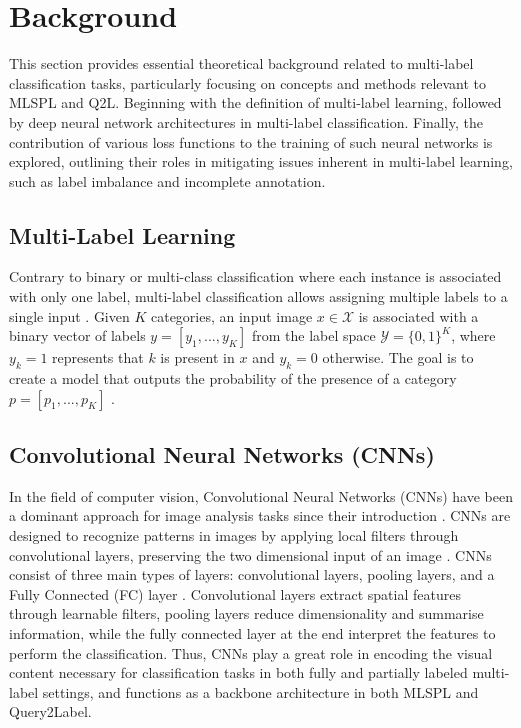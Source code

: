 \documentclass[lettersize,journal]{IEEEtran}
\begin{document}
\section{Background}
This section provides essential theoretical background related to multi-label classification tasks, particularly focusing on concepts and methods relevant to MLSPL and Q2L.  Beginning with the definition of multi-label learning, followed by deep neural network architectures in multi-label classification. Finally, the contribution of various loss functions to the training of such neural networks is explored, outlining their roles in mitigating issues inherent in multi-label learning, such as label imbalance and incomplete annotation.

\subsection{Multi-Label Learning}
Contrary to binary or multi-class classification where each instance is associated with only one label, multi-label classification allows assigning multiple labels to a single input \cite{mlsp}. Given $K$ categories, an input image $x\in \mathcal{X}$ is associated with a binary vector of labels $y=[y_1,...,y_K]$ from the label space $\mathcal{Y}=\{0,1\}^K$, where $y_k=1$ represents that $k$ is present in $x$ and $y_k=0$ otherwise. The goal is to create a model that outputs the probability of the presence of a category $p=[p_1,...,p_K]$ \cite{mlsp,Query2Label}.

\subsection{Convolutional Neural Networks (CNNs)}
In the field of computer vision, Convolutional Neural Networks (CNNs) have been a dominant approach for image analysis tasks since their introduction \cite{lecun95}. CNNs are designed to recognize patterns in images by applying local filters through convolutional layers, preserving the two dimensional input of an image \cite{zhang2023dive}. CNNs consist of three main types of layers: convolutional layers, pooling layers, and a Fully Connected (FC) layer \cite{asawaCS231n}. Convolutional layers extract spatial features through learnable filters, pooling layers reduce dimensionality and summarise information, while the fully connected layer at the end interpret the features to perform the classification. Thus, CNNs play a great role in encoding the visual content necessary for classification tasks in both fully and partially labeled multi-label settings, and functions as a backbone architecture in both MLSPL and Query2Label.
\end{document}
